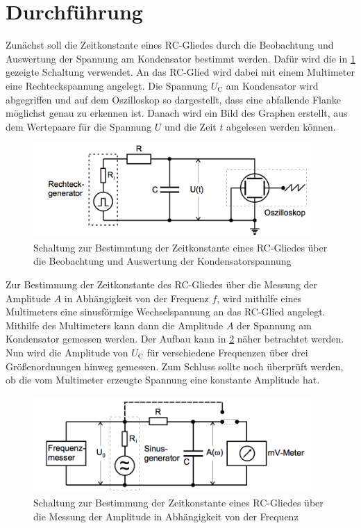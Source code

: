 \section{Durchführung}
\label{sec:Durchführung}
Zunächst soll die Zeitkonstante eines RC-Gliedes durch die Beobachtung und Auswertung
der Spannung am Kondensator bestimmt werden. Dafür wird die in \ref{fig:Schaltung_4a}
gezeigte Schaltung verwendet. An das RC-Glied wird dabei mit einem Multimeter eine
Rechteckspannung angelegt. Die Spannung $U_{\text{C}}$ am Kondensator wird abgegriffen und auf dem
Oszilloskop so dargestellt, dass eine abfallende Flanke möglichst genau zu erkennen ist.
Danach wird ein Bild des Graphen erstellt, aus dem Wertepaare für die Spannung $U$
und die Zeit $t$ abgelesen werden können.

\begin{figure}
  \centering
  \includegraphics[width=300pt]{data/4a_schaltung.png}
  \caption{Schaltung zur Bestimmtung der Zeitkonstante eines RC-Gliedes über die Beobachtung
  und Auswertung der Kondensatorspannung \cite{Versuchsanleitung}}
  \label{fig:Schaltung_4a}
\end{figure}

Zur Bestimmung der Zeitkonstante des RC-Gliedes über die Messung der Amplitude $A$ in
Abhängigkeit von der Frequenz $f$, wird mithilfe eines Multimeters eine sinusförmige
Wechselspannung an das RC-Glied angelegt. Mithilfe des Multimeters kann dann die Amplitude
$A$ der Spannung am Kondensator gemessen werden. Der Aufbau kann in \ref{fig:Schaltung_4b}
näher betrachtet werden. Nun wird die Amplitude von $U_{\text{C}}$ für
verschiedene Frequenzen über drei Größenordnungen hinweg gemessen. Zum Schluss sollte
noch überprüft werden, ob die vom Multimeter erzeugte Spannung eine konstante Amplitude hat.

\begin{figure}
  \centering
  \includegraphics[width=300pt]{data/4b_schaltung.png}
  \caption{Schaltung zur Bestimmung der Zeitkonstante eines RC-Gliedes über die Messung
  der Amplitude in Abhängigkeit von der Frequenz \cite{Versuchsanleitung}}
  \label{fig:Schaltung_4b}
\end{figure}

